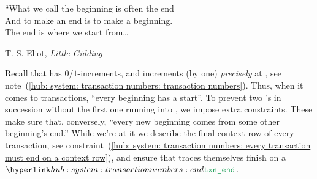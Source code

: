 \epigraph{
	“What we call the beginning is often the end \\
	And to make an end is to make a beginning.   \\
	The end is where we start from\dots{}}
{T. S. Eliot, \textit{Little Gidding}}

\noindent Recall that \totalTransactionNumber{} has $0/1$-increments, and increments (by one) \emph{precisely} at \transactionStart{},
see note~(\ref{hub: system: transaction numbers: transaction numbers}).
Thus, when it comes to transactions, ``every beginning has a start''.
To prevent two \transactionStart{}'s in succession without the first one running into \transactionEnd{},
we impose extra constraints.
These make sure that, conversely,
``every new beginning comes from some other beginning's end.''
While we're at it we describe the final context-row of every transaction,
see constraint~(\ref{hub: system: transaction numbers: every transaction must end on a context row}),
and ensure that traces themselves finish on a $\transactionEnd$.

